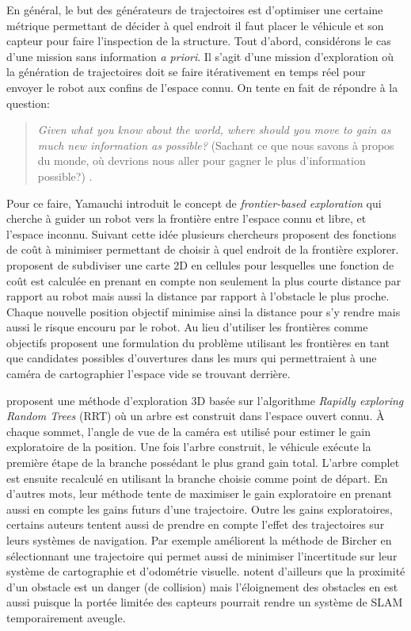 En général, le but des générateurs de trajectoires est d'optimiser une certaine métrique permettant de décider à quel endroit il faut placer le véhicule et son capteur pour faire l'inspection de la structure. Tout d'abord, considérons le cas d'une mission sans information \textit{a priori}. Il s'agit d'une mission d'exploration où la génération de trajectoires doit se faire itérativement en temps réel pour envoyer le robot aux confins de l'espace connu. On tente en fait de répondre à la question:

\begin{quote}
  \emph{Given what you know about the world, where should you move to gain as much new information as possible?} (Sachant ce que nous savons à propos du monde, où devrions nous aller pour gagner le plus d'information possible?) \citep{Yamauchi1997}.
\end{quote}

Pour ce faire, Yamauchi introduit le concept de \textit{frontier-based exploration} qui cherche à guider un robot vers la frontière entre l'espace connu et libre, et l'espace inconnu. Suivant cette idée plusieurs chercheurs proposent des fonctions de coût à minimiser permettant de choisir à quel endroit de la frontière explorer. \citep{Wirth2007} proposent de subdiviser une carte 2D en cellules pour lesquelles une fonction de coût est calculée en prenant en compte non seulement la plus courte distance par rapport au robot mais aussi la distance par rapport à l'obstacle le plus proche. Chaque nouvelle position objectif minimise ainsi la distance pour s'y rendre mais aussi le risque encouru par le robot. Au lieu d'utiliser les frontières comme objectifs \citep{Dornhege2011} proposent une formulation du problème utilisant les frontières en tant que candidates possibles d'ouvertures dans les murs qui permettraient à une caméra de cartographier l'espace vide se trouvant derrière.

\citep{Bircher2016} proposent une méthode d'exploration 3D basée sur l'algorithme \textit{Rapidly exploring Random Trees} (RRT) où un arbre est construit dans l'espace ouvert connu. À chaque sommet, l'angle de vue de la caméra est utilisé pour estimer le gain exploratoire de la position. Une fois l'arbre construit, le véhicule exécute la première étape de la branche possédant le plus grand gain total. L'arbre complet est ensuite recalculé en utilisant la branche choisie comme point de départ. En d'autres mots, leur méthode tente de maximiser le gain exploratoire en prenant aussi en compte les gains futurs d'une trajectoire. Outre les gains exploratoires, certains auteurs tentent aussi de prendre en compte l'effet des trajectoires sur leurs systèmes de navigation. Par exemple \citep{Papachristos2017} améliorent la méthode de Bircher en sélectionnant une trajectoire qui permet aussi de minimiser l'incertitude sur leur système de cartographie et d'odométrie visuelle. \citep{Wirth2007} notent d'ailleurs que la proximité d'un obstacle est un danger (de collision) mais l'éloignement des obstacles en est aussi puisque la portée limitée des capteurs pourrait rendre un système de SLAM temporairement aveugle.

